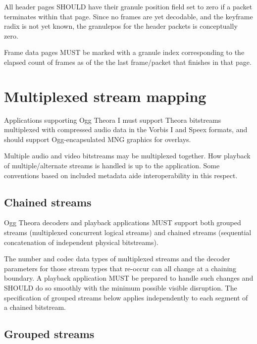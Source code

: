\documentclass[9pt,letterpaper]{book}
\numberwithin{equation}{chapter}
\numberwithin{figure}{chapter}
\numberwithin{table}{chapter}
\begin{document}
All header pages SHOULD have their granule position field set to zero if
 a packet terminates within that page. Since no frames are yet decodable,
 and the keyframe radix is not yet known, the granulepos for the header
 packets is conceptually zero.

Frame data pages MUST be marked with a granule index corresponding to
 the elapsed count of frames as of the the last frame/packet that 
 finishes in that page.


\section{Multiplexed stream mapping}

Applications supporting Ogg Theora I must support Theora bitstreams
 multiplexed with compressed audio data in the Vorbis I and Speex
 formats, and should support Ogg-encapsulated MNG graphics for overlays.

Multiple audio and video bitstreams may be multiplexed together.
How playback of multiple/alternate streams is handled is up to the
 application.
Some conventions based on included metadata aide interoperability
 in this respect.

\subsection{Chained streams}

Ogg Theora decoders and playback applications MUST support both grouped
 streams (multiplexed concurrent logical streams) and chained streams
 (sequential concatenation of independent physical bitstreams).

The number and codec data types of multiplexed streams and the decoder
 parameters for those stream types that re-occur can all change at a
 chaining boundary.
A playback application MUST be prepared to handle such changes and
 SHOULD do so smoothly with the minimum possible visible disruption.
The specification of grouped streams below applies independently to each
 segment of a chained bitstream.

\subsection{Grouped streams}
\end{document}
